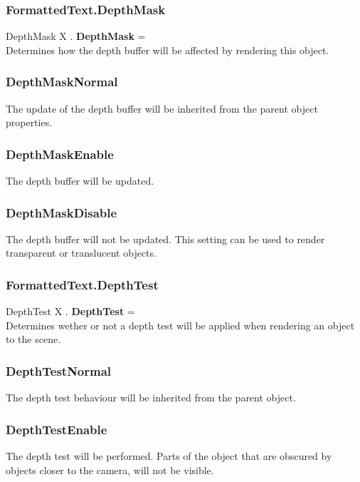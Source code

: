 \subsubsection{FormattedText.DepthMask \label{F:FormattedText:DepthMask}}
DepthMask X . \textbf{DepthMask} = \\
Determines how the depth buffer will be affected by rendering this object.

\subsubsection{DepthMaskNormal \label{T:DepthMask|DepthMaskNormal}}
The update of the depth buffer will be inherited from the parent object properties.

\subsubsection{DepthMaskEnable \label{T:DepthMask|DepthMaskEnable}}
The depth buffer will be updated.

\subsubsection{DepthMaskDisable \label{T:DepthMask|DepthMaskDisable}}
The depth buffer will not be updated. This setting can be used to render transparent or translucent objects.

\subsubsection{FormattedText.DepthTest \label{F:FormattedText:DepthTest}}
DepthTest X . \textbf{DepthTest} = \\
Determines wether or not a depth test will be applied when rendering an object to the scene.

\subsubsection{DepthTestNormal \label{T:DepthTest|DepthTestNormal}}
The depth test behaviour will be inherited from the parent object.

\subsubsection{DepthTestEnable \label{T:DepthTest|DepthTestEnable}}
The depth test will be performed. Parts of the object that are obscured by objects closer to the camera, will not be visible.

